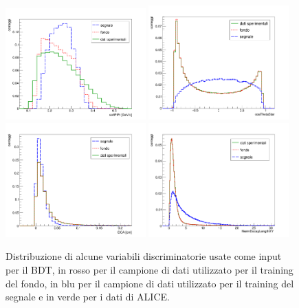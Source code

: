    \begin{figure}
       \centering
       \includegraphics[width=0.48\textwidth]{training&testing/softPiPt_DBS.png}
        \includegraphics[width=0.48\textwidth]{AnalisiDati/cosTehtaStar_DBS.png}\\
        \includegraphics[width=0.48\textwidth]{training&testing/DCA_DBS.png}
        \includegraphics[width=0.48\textwidth]{training&testing/NormDecayLengthXY.png}
       \caption{Distribuzione di alcune variabili discriminatorie usate come input per il BDT,  in rosso per il campione di dati utilizzato per il training del fondo, in blu per il campione di dati utilizzato per il training del segnale e in verde per i dati di ALICE.}
       \label{fig:variabili_discr}
   \end{figure}
   
